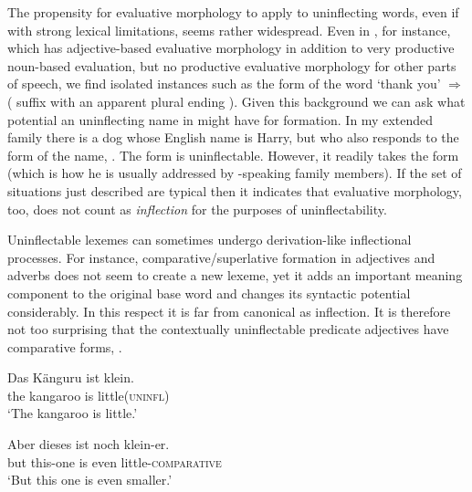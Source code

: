\documentclass[output=paper,colorlinks,citecolor=brown]{langscibook}
\begin{document}
The propensity for evaluative morphology to apply to uninflecting words, even if with strong lexical limitations, seems rather widespread. Even in  , for instance, which has  adjective-based evaluative morphology in addition to very productive noun-based evaluation, but no productive evaluative morphology for other parts of speech, we find isolated instances such as the  form of the word   `thank you' $\Rightarrow$ \mbox{} ( suffix  with an apparent plural ending ).  Given this background we can ask what potential an uninflecting name in  might have for  formation. In my extended family there is a dog whose English name is Harry, but who also responds to the  form of the name, . The  form is  uninflectable. However, it readily takes the  form  (which is how he is usually addressed by -speaking family members). If  the set of situations just described are  typical then it indicates that evaluative morphology, too, does not count as \textit{inflection} for the purposes of uninflectability.

Uninflectable lexemes can sometimes undergo derivation-like inflectional processes. For instance, comparative/superlative formation in  adjectives and adverbs does not seem to create a new lexeme, yet it adds an important meaning component to the original base word and changes its syntactic potential considerably. In this respect it is far from canonical as inflection. It is therefore not too surprising that the   contextually uninflectable predicate adjectives have comparative forms, .

\ea\label{kleiner} 
\begin{xlist} 	
	\ex \gll	Das Känguru ist {klein}.\\
	the kangaroo is little(\textsc{uninfl})\\
	\glt			`The kangaroo is little.' 
	
	\ex \gll 	Aber dieses ist noch {klein-er}.		\\
	but  this-one is even little-\textsc{comparative} \\
	\glt			`But this one is even smaller.'
\end{xlist}
\z
\end{document}
